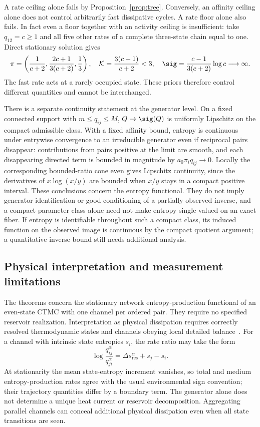 A rate ceiling alone fails by Proposition~\ref{prop:tree}. Conversely, an
affinity ceiling alone does not control arbitrarily fast dissipative
cycles. A rate floor alone also fails. In fact even a floor together with
an activity ceiling is insufficient: take $q_{12}=c\ge1$ and all five
other rates of a complete three-state chain equal to one. Direct
stationary solution gives
\begin{equation}
 \pi=\left(\frac1{c+2},\frac{2c+1}{3(c+2)},\frac13\right),\quad
 \mathcal K=\frac{3(c+1)}{c+2}<3,\quad
 \sig=\frac{c-1}{3(c+2)}\log c\longrightarrow\infty.
\end{equation}
The fast rate acts at a rarely occupied state. These priors therefore
control different quantities and cannot be interchanged.

There is a separate continuity statement at the generator level. On a
fixed connected support with $m\le q_{ij}\le M$, $Q\mapsto\sig(Q)$ is
uniformly Lipschitz on the compact admissible class. With a fixed
affinity bound, entropy is continuous under entrywise convergence to an
irreducible generator even if reciprocal pairs disappear: contributions
from pairs positive at the limit are smooth, and each disappearing
directed term is bounded in magnitude by $a_0\pi_iq_{ij}\to0$.
Locally the corresponding bounded-ratio cone even gives Lipschitz
continuity, since the derivatives of $x\log(x/y)$ are bounded when
$x/y$ stays in a compact positive interval. These conclusions concern
the entropy functional. They do not imply generator identification or
good conditioning of a partially observed inverse, and a compact
parameter class alone need not make entropy single valued on an exact
fiber. If entropy is identifiable throughout such a compact class, its
induced function on the observed image is continuous by the compact
quotient argument; a quantitative inverse bound still needs additional
analysis.

\subsection{Physical interpretation and measurement limitations}
The theorems concern the stationary network entropy-production
functional of an even-state CTMC with one channel per ordered pair.
They require no specified reservoir realization. Interpretation as
physical dissipation requires correctly resolved thermodynamic states
and channels obeying local detailed balance~\cite{Esposito2012}.
For a channel with intrinsic state entropies $s_i$, the rate ratio may
take the form
\begin{equation}
 \log\frac{q_{ij}^{\alpha}}{q_{ji}^{\alpha}}
 =\Delta s_{\mathrm{res}}^{\alpha}+s_j-s_i.
\end{equation}
At stationarity the mean state-entropy increment vanishes, so total and
medium entropy-production rates agree with the usual environmental
sign convention; their trajectory quantities differ by a boundary term.
The generator alone does not determine a unique heat current or
reservoir decomposition. Aggregating parallel channels can conceal
additional physical dissipation even when all state transitions are seen.

